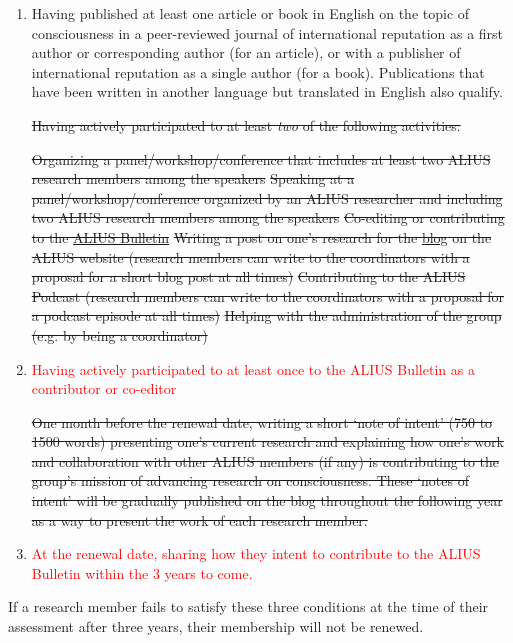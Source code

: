 \documentclass[a4paper, 11pt]{scrartcl}
\begin{document}
\begin{enumerate}

\item Having published at least one article or book in English on the topic of consciousness in a peer-reviewed journal of international reputation as a first author or corresponding author (for an article), or with a publisher of international reputation as a single author (for a book). Publications that have been written in another language but translated in English also qualify.

\sout{Having actively participated to at least \emph{two} of the following activities:}

\sout{Organizing a panel/workshop/conference that includes at least two ALIUS research members among the speakers}
\sout{Speaking at a panel/workshop/conference organized by an ALIUS researcher and including two ALIUS research members among the speakers}
\sout{Co-editing or contributing to the \href{https://www.aliusresearch.org/bulletin.html}{ALIUS Bulletin}}
\sout{Writing a post on one's research for the \href{https://www.aliusresearch.org/blog.html}{blog} on the ALIUS website (research members can write to the coordinators with a proposal for a short blog post at all times)}
 \sout{Contributing to the ALIUS Podcast (research members can write to the coordinators with a proposal for a podcast episode at all times)}
\sout{Helping with the administration of the group (e.g. by being a coordinator)}

\item \textcolor{red}{Having actively participated to at least once to the ALIUS Bulletin as a contributor or co-editor}

\sout{One month before the renewal date, writing a short `note of intent' (750 to 1500 words) presenting one's current research and explaining how one's work and collaboration with other ALIUS members (if any) is contributing to the group's mission of advancing research on consciousness. These `notes of intent' will be gradually published on the blog throughout the following year as a way to present the work of each research member.}
\item\textcolor{red}{At the renewal date, sharing how they intent to contribute to the ALIUS Bulletin within the 3 years to come.}

\end{enumerate}

If a research member fails to satisfy these three conditions at the time of their assessment after three years, their membership will not be renewed.
\end{document}
